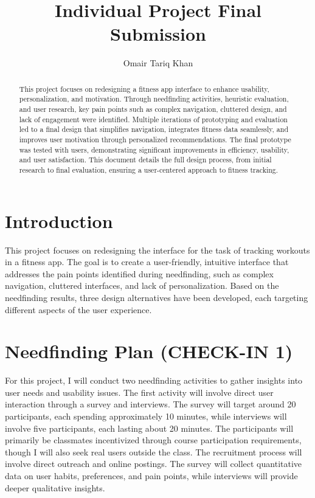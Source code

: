 \documentclass[
	letterpaper, %
]{jdf}
\author{Omair Tariq Khan}
\title{Individual Project Final Submission}
\begin{document}

\maketitle

\begin{abstract}
	This project focuses on redesigning a fitness app interface to enhance usability, personalization, and motivation. Through needfinding activities, heuristic evaluation, and user research, key pain points such as complex navigation, cluttered design, and lack of engagement were identified. Multiple iterations of prototyping and evaluation led to a final design that simplifies navigation, integrates fitness data seamlessly, and improves user motivation through personalized recommendations. The final prototype was tested with users, demonstrating significant improvements in efficiency, usability, and user satisfaction. This document details the full design process, from initial research to final evaluation, ensuring a user-centered approach to fitness tracking.
\end{abstract}

\section{Introduction}
This project focuses on redesigning the interface for the task of tracking workouts in a fitness app. The goal is to create a user-friendly, intuitive interface that addresses the pain points identified during needfinding, such as complex navigation, cluttered interfaces, and lack of personalization. Based on the needfinding results, three design alternatives have been developed, each targeting different aspects of the user experience.

\section{Needfinding Plan (CHECK-IN 1)}
For this project, I will conduct two needfinding activities to gather insights into user needs and usability issues. The first activity will involve direct user interaction through a survey and interviews. The survey will target around 20 participants, each spending approximately 10 minutes, while interviews will involve five participants, each lasting about 20 minutes. The participants will primarily be classmates incentivized through course participation requirements, though I will also seek real users outside the class. The recruitment process will involve direct outreach and online postings. The survey will collect quantitative data on user habits, preferences, and pain points, while interviews will provide deeper qualitative insights.
\end{document}
